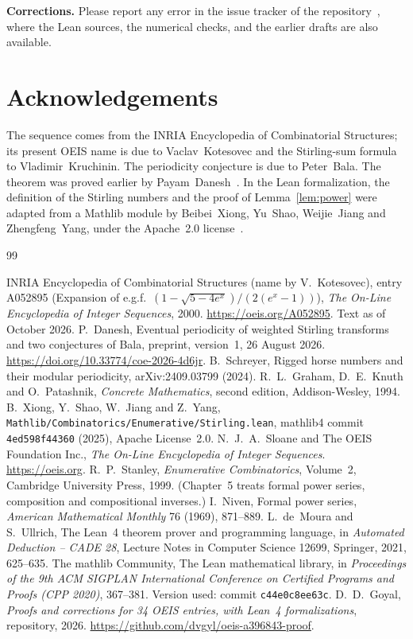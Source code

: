 \documentclass[11pt,a4paper]{article}
\theoremstyle{definition}
\theoremstyle{remark}
\newcommand{\para}[1]{\par\medskip\noindent\textbf{#1}\enspace}
\begin{document}
\para{Corrections.} Please report any error in the issue tracker of the repository~\cite{repo}, where the Lean
sources, the numerical checks, and the earlier drafts are also available.

\section*{Acknowledgements}
The sequence comes from the INRIA Encyclopedia of Combinatorial Structures; its present OEIS name is due to Vaclav~Kotesovec and the Stirling-sum formula to Vladimir~Kruchinin. The periodicity conjecture is due to Peter~Bala. The theorem was proved earlier by
Payam~Danesh~\cite{danesh}. In the Lean formalization, the definition of the Stirling numbers and the proof of
Lemma~\ref{lem:power} were adapted from a Mathlib module by Beibei~Xiong, Yu~Shao, Weijie~Jiang and Zhengfeng~Yang, under
the Apache~2.0 license~\cite{stirlingmathlib}.

\begin{thebibliography}{99}\small
\raggedright
{} INRIA Encyclopedia of Combinatorial Structures (name by V.~Kotesovec), entry A052895 (Expansion of e.g.f.\ $(1-\sqrt{5-4e^x})/(2(e^x-1))$), \emph{The On-Line Encyclopedia of Integer Sequences}, 2000. \url{https://oeis.org/A052895}. Text as of October 2026.
 P.~Danesh, Eventual periodicity of weighted Stirling transforms and two conjectures of Bala, preprint, version~1, 26 August 2026. \url{https://doi.org/10.33774/coe-2026-4d6jr}.
 B.~Schreyer, Rigged horse numbers and their modular periodicity, arXiv:2409.03799 (2024).
 R.~L.~Graham, D.~E.~Knuth and O.~Patashnik, \emph{Concrete Mathematics}, second edition, Addison-Wesley, 1994.
 B.~Xiong, Y.~Shao, W.~Jiang and Z.~Yang, \texttt{Mathlib/Combinatorics/Enumerative/Stirling.lean}, mathlib4 commit \texttt{4ed598f44360} (2025), Apache License~2.0.
 N.~J.~A.~Sloane and The OEIS Foundation Inc., \emph{The On-Line Encyclopedia of Integer Sequences}. \url{https://oeis.org}.
 R.~P.~Stanley, \emph{Enumerative Combinatorics}, Volume~2, Cambridge University Press, 1999. (Chapter~5 treats formal power series, composition and compositional inverses.)
 I.~Niven, Formal power series, \emph{American Mathematical Monthly} 76 (1969), 871--889.
 L.~de~Moura and S.~Ullrich, The Lean~4 theorem prover and programming language, in \emph{Automated Deduction -- CADE 28}, Lecture Notes in Computer Science 12699, Springer, 2021, 625--635.
 The mathlib Community, The Lean mathematical library, in \emph{Proceedings of the 9th ACM SIGPLAN International Conference on Certified Programs and Proofs (CPP 2020)}, 367--381. Version used: commit \texttt{c44e0c8ee63c}.
 D.~D.~Goyal, \emph{Proofs and corrections for 34 OEIS entries, with Lean~4 formalizations}, repository, 2026. \url{https://github.com/dvgyl/oeis-a396843-proof}.
\end{thebibliography}
\end{document}

